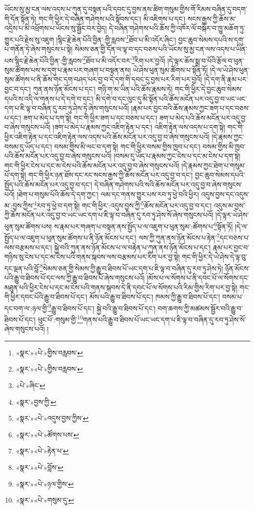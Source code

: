 ཡོངས་སུ་མྱ་ངན་ལས་འདས་པ་ཀུན་དུ་བསྟན་པའི་དབང་དུ་བྱས་ནས་ཚིག་གསུམ་གྱིས་གོ་རིམས་བཞིན་དུ་བདག་གི་དོན་སྟོན་ཏེ། གང་གི་ཕྱིར་དེ་བཞིན་གཤེགས་པའི་སྟོབས་དང་། མི་འཇིགས་པ་དང་། སངས་རྒྱས་ཀྱི་ཆོས་མ་འདྲེས་པ་མི་འཕྲོགས་པ་ཡོངས་སུ་སྦྱོང་བར་བྱེད། དེ་བཞིན་གཤེགས་པའི་ཆོས་ཀྱི་འཁོར་ལོ་བསྐོར་བ་ཁྱུ་མཆོག་ཏུ་གྱུར་པའི་རྗེས་སུ་འཇུག །སྙིང་རྗེ་ཆེན་པོའི་བྱིན་:གྱི་རླབས་\footnote{«སྣར་»«པེ་»གྱིས་བརླབས་}ཐོབ་པ་མི་འདོར་ཞིང་། བྱང་ཆུབ་སེམས་དཔའི་ས་དགུ་པ་གནོན་ཏེ་ཞེས་གསུངས་པ་སྟེ། སེམས་ཅན་གྱི་དོན་ལ་ལྟ་བ་དང་བཅས་པའི་ཡོངས་སུ་མྱ་ངན་ལས་འདས་པ་ཡིན་པས་སྙིང་རྗེ་ཆེན་པོའི་བྱིན་:གྱི་རླབས་\footnote{«སྣར་»«པེ་»གྱིས་བརླབས་}ཐོབ་པ་མི་འདོར་བར་\footnote{«པེ་»ཞིང་}རིག་པར་བྱའོ། །དེ་ལྟར་ཆོས་སྨྲ་བ་པོའི་རྩོལ་བ་ཕུན་སུམ་ཚོགས་པས་ས་དགུ་པ་རྣམ་པར་གཞག་པ་བསྟན་ནས། ཡེ་ཤེས་ཕུན་སུམ་ཚོགས་པ་སྟོན་ཏོ། །དེ་ལ་ཡེ་ཤེས་ཕུན་སུམ་ཚོགས་པ་ནི་ཆོས་གང་དག་བཤད་པར་བྱ་བ་དེ་དག་གི་དབང་དུ་བྱས་པར་རིག་པར་བྱའོ། །དེ་དག་ནི་རྣམ་པར་བྱང་བ་དང་། ཀུན་ནས་ཉོན་མོངས་པ་དང་། གཉི་ག་མ་ཡིན་པའི་ཆོས་རྣམས་ཏེ། གང་གི་ཕྱིར་དེ་བྱང་ཆུབ་སེམས་དཔའི་ས་འདི་ལ་གནས་པ་དེ་དགེ་བ་དང་། མི་དགེ་བ་དང་ལུང་དུ་མི་སྟོན་པའི་ཆོས་མངོན་པར་འདུ་བྱ་བ་ཡང་ཡང་དག་པ་ཇི་ལྟ་བ་བཞིན་དུ་རབ་ཏུ་ཤེས་ཏེ་ཞེས་གསུངས་པའོ། །རྣམ་པར་བྱང་བའི་ཆོས་རྣམས་ཀྱང་ཟག་པ་དང་བཅས་པ་དང་། ཟག་པ་མེད་པ་དག་སྟེ། གང་གི་ཕྱིར་ཟག་པ་དང་བཅས་པ་དང་། ཟག་པ་མེད་པའི་ཆོས་མངོན་པར་འདུ་བྱ་བ་ཞེས་གསུངས་པའོ། །ཟག་པ་མེད་པ་རྣམས་ཀྱང་འཇིག་རྟེན་པ་དང་། འཇིག་རྟེན་ལས་འདས་པ་དག་སྟེ། གང་གི་ཕྱིར་འཇིག་རྟེན་པ་དང་འཇིག་རྟེན་ལས་འདས་པའི་ཆོས་མངོན་པར་འདུ་བྱ་བ་ཞེས་གསུངས་པའོ། །དེ་རྣམས་ཀྱང་བསམ་དུ་ཡོད་པ་དང་། བསམ་གྱིས་མི་ལང་བ་དག་སྟེ། གང་གི་ཕྱིར་བསམ་གྱིས་ཁྱབ་པ་དང་། བསམ་གྱིས་མི་ཁྱབ་པའི་ཆོས་མངོན་པར་འདུ་བྱ་བ་ཞེས་གསུངས་པའོ། །བསམ་དུ་ཡོད་པ་རྣམས་ཀྱང་ངེས་པ་དང་མ་ངེས་པ་དག་སྟེ། གང་གི་ཕྱིར་ངེས་པ་དང་མ་ངེས་པའི་ཆོས་མངོན་པར་འདུ་བྱ་བ་ཞེས་གསུངས་པའོ། །དེ་རྣམས་ཀྱང་ཐེག་པ་གསུམ་པོ་དག་སྟེ། གང་གི་ཕྱིར་ཉན་ཐོས་དང་རང་སངས་རྒྱས་ཀྱི་ཆོས་མངོན་པར་འདུ་བྱ་བ་དང་། བྱང་ཆུབ་སེམས་དཔའི་སྤྱོད་པའི་ཆོས་མངོན་པར་འདུ་བྱ་བ་དང་། དེ་བཞིན་གཤེགས་པའི་སའི་ཆོས་མངོན་པར་འདུ་བྱ་བ་ཞེས་གསུངས་པའོ། །ཐེག་པ་གསུམ་པོའི་ཆོས་དེ་དག་ཀྱང་། ལམ་དང་གནས་གྱུར་པས་རབ་ཏུ་ཕྱེ་བའི་ཕྱིར། འདུས་བྱས་དང་འདུས་མ་:བྱས་ཀྱིས་\footnote{«སྣར་»བྱས་ཀྱི་}རབ་ཏུ་ཕྱེ་བ་དག་སྟེ། གང་གི་ཕྱིར་:འདུས་བྱས་ཀྱི་\footnote{«སྣར་»«པེ་»འདུས་བྱས་ཀྱིས་}ཆོས་མངོན་པར་འདུ་བྱ་བ་དང་། འདུས་མ་བྱས་ཀྱི་ཆོས་མངོན་པར་འདུ་བྱ་བ་ཡང་ཡང་དག་པ་ཇི་ལྟ་བ་བཞིན་དུ་རབ་ཏུ་ཤེས་སོ་ཞེས་གསུངས་པའོ། །དེ་ལྟར་ཡེ་ཤེས་ཕུན་སུམ་ཚོགས་པས། ས་རྣམ་པར་གཞག་པ་བསྟན་ནས་སྤྱོད་པ་ལ་འཇུག་པ་ཕུན་སུམ་:ཚོགས་པ་\footnote{«སྣར་»«པེ་»ཚོགས་པས་}སྟོན་ཏོ། །དེ་ལ་སྤྱོད་པ་ལ་འཇུག་པ་ཕུན་སུམ་ཚོགས་པ་ནི་ཉོན་མོངས་པ་དང་། ལས་ཀྱི་ཀུན་ནས་ཉོན་མོངས་པ་རྟེན་\footnote{«སྣར་»«པེ་»རྟེན་པ་}དང་བཅས་པ་ལས་བརྩམས་པ་དང་། སྐྱེ་བའི་ཀུན་ནས་ཉོན་མོངས་པ་ལ་བརྟེན་པ་ཀུན་ནས་ཉོན་མོངས་པ་དང་། རྣམ་པར་བྱང་བ་གཉིས་སུ་ངེས་པ་དང་མ་ངེས་པའི་གནས་སྐབས་ལས་བརྩམས་པར་རིག་པར་བྱ་སྟེ། གང་གི་ཕྱིར་དེ་ཡེ་ཤེས་དེ་ལྟ་བུ་དང་ལྡན་པའི་བློ་\footnote{«སྣར་»«པེ་»བློས་}སེམས་ཅན་གྱི་སེམས་ཀྱི་རྒྱུ་བ་ཐིབས་པོ་ཡང་དག་པ་ཇི་ལྟ་བ་བཞིན་དུ་རབ་ཏུ་ཤེས་ཏེ། ཉོན་མོངས་པའི་རྒྱུ་བ་ཐིབས་པོ་དང་ལས་ཀྱི་རྒྱུ་བ་ཐིབས་པོ་ཞེས་གསུངས་པའོ། །མོས་པ་ལ་སོགས་པ་ནི་དབང་པོ་ལ་སོགས་དང་མཐུན་པའི་ཕྱིར་ངེས་པ་དང་མ་ངེས་པའི་གནས་སྐབས་དེ་ནི་དབང་པོ་ལ་སོགས་པའི་རིམ་གྱིས་རིག་པར་བྱ་སྟེ། གང་གི་ཕྱིར་དབང་པོའི་རྒྱུ་བ་ཐིབས་པོ་དང་། མོས་པའི་རྒྱུ་བ་ཐིབས་པོ་དང་། ཁམས་ཀྱི་རྒྱུ་བ་ཐིབས་པོ་དང་། བསམ་པ་དང་བག་ལ་:ཉལ་གྱི་\footnote{«སྣར་»«པེ་»ཉལ་གྱིས་}རྒྱུ་བ་ཐིབས་པོ་དང་། སྐྱེ་བའི་རྒྱུ་བ་ཐིབས་པོ་དང་། བག་ཆགས་ཀྱི་མཚམས་སྦྱོར་བའི་རྒྱུ་བ་ཐིབས་པོ་དང་། ཕུང་པོ་:གསུམ་གྱི་\footnote{«སྣར་»«པེ་»གསུམ་དུ་}གནས་པའི་རྒྱུ་བ་ཐིབས་པོ་ཡང་ཡང་དག་པ་ཇི་ལྟ་བ་བཞིན་དུ་རབ་ཏུ་ཤེས་སོ་ཞེས་གསུངས་པའོ། །
